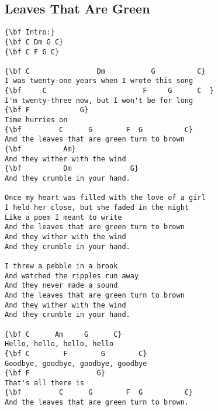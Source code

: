 \documentclass[a4paper]{article}
\begin{document}
\subsection{Leaves That Are Green} %
\label{sub:The Leaves That Are Gree}
\begin{Verbatim}[commandchars=\\\{\}]
{\bf Intro:}
{\bf C Dm G C}
{\bf C F G C}

{\bf C                Dm           G          C}
I was twenty-one years when I wrote this song
{\bf     C                       F     G      C  }
I'm twenty-three now, but I won't be for long
{\bf F            G}
Time hurries on
{\bf         C      G        F  G          C}
And the leaves that are green turn to brown
{\bf          Am}
And they wither with the wind
{\bf          Dm              G}
And they crumble in your hand.

Once my heart was filled with the love of a girl
I held her close, but she faded in the night
Like a poem I meant to write
And the leaves that are green turn to brown
And they wither with the wind
And they crumble in your hand.

I threw a pebble in a brook
And watched the ripples run away
And they never made a sound
And the leaves that are green turn to brown
And they wither with the wind
And they crumble in your hand.

{\bf C      Am     G      C}
Hello, hello, hello, hello
{\bf C        F        G        C}
Goodbye, goodbye, goodbye, goodbye
{\bf F                G}
That's all there is
{\bf         C      G        F  G          C}
And the leaves that are green turn to brown.
\end{Verbatim}
\newpage
\end{document}
